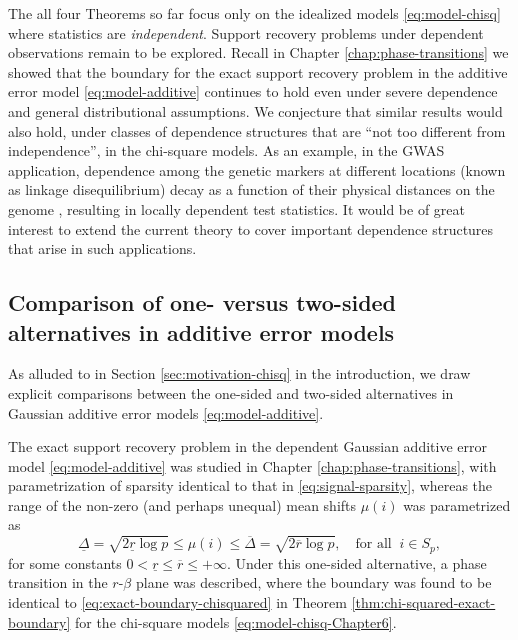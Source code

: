 The all four Theorems so far focus only on the idealized models \eqref{eq:model-chisq} where statistics are \emph{independent}.
Support recovery problems under dependent observations remain to be explored.
Recall in Chapter \ref{chap:phase-transitions} we showed that the boundary for the exact support recovery problem in the additive error model \eqref{eq:model-additive} continues to hold even under severe dependence and general distributional assumptions.
We conjecture that similar results would also hold, under classes of dependence structures that are ``not too different from independence'', in the chi-square models.
As an example, in the GWAS application, dependence among the genetic markers at different locations (known as linkage disequilibrium) decay as a function of their physical distances on the genome \citep{bush2012genome}, resulting in locally dependent test statistics.
It would be of great interest to extend the current theory to cover important dependence structures that arise in such applications.


\subsection{Comparison of one- versus two-sided alternatives in additive error models}
\label{subsec:one-vs-two-sided}


As alluded to in Section \ref{sec:motivation-chisq} in the introduction, we draw explicit comparisons between the one-sided and two-sided alternatives in Gaussian additive error models \eqref{eq:model-additive}.

The exact support recovery problem in the dependent Gaussian additive error model \eqref{eq:model-additive} was studied in Chapter \ref{chap:phase-transitions}, with parametrization of sparsity identical to that in \eqref{eq:signal-sparsity}, whereas the range of the non-zero (and perhaps unequal) mean shifts $\mu(i)$ was parametrized as 
\begin{equation*}
    \underline{\Delta} = \sqrt{2\underline{r}\log{p}}
    \le \mu(i) \le
    \overline{\Delta} = \sqrt{2\overline{r}\log{p}}, \quad \text{for all}\;\;i\in S_p,
\end{equation*}
for some constants $0<\underline{r}\le\overline{r}\le+\infty$.
Under this one-sided alternative, a phase transition in the $r$-$\beta$ plane was described, where the boundary was found to be identical to \eqref{eq:exact-boundary-chisquared} in Theorem \ref{thm:chi-squared-exact-boundary} for the chi-square models \eqref{eq:model-chisq-Chapter6}. 


